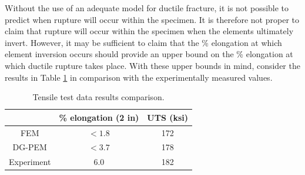
Without the use of an adequate model for ductile fracture, it is not possible to predict when rupture will occur within the specimen. It is therefore not proper to claim that rupture will occur within the specimen when the elements ultimately invert. However, it may be sufficient to claim that the \% elongation at which element inversion occurs should provide an upper bound on the \% elongation at which ductile rupture takes place. With these upper bounds in mind, consider the results in Table \ref{tab:tensile_test_data_results} in comparison with the experimentally measured values.

\begin{table}
\centering
\begin{tabular}{| c || c | c |}
    \hline
               & \% elongation (2 in) & UTS (ksi) \\ \hline \hline
    FEM        & $<1.8$ & 172 \\ \hline
    DG-PEM     & $<3.7$ & 178 \\ \hline
    Experiment & 6.0 & 182 \\
    \hline
\end{tabular}
\caption{Tensile test data results comparison.}
\label{tab:tensile_test_data_results}
\end{table}

